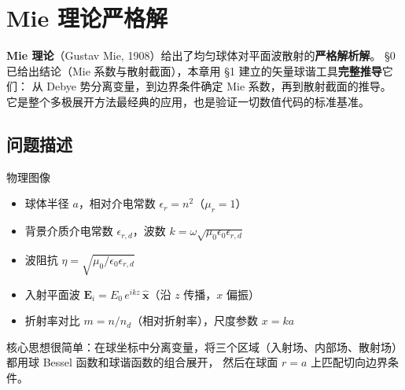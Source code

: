 \section{Mie 理论严格解}

\textbf{Mie 理论}（Gustav Mie, 1908）给出了均匀球体对平面波散射的\textbf{严格解析解}。
\S0 已给出结论（Mie 系数与散射截面），本章用 \S1 建立的矢量球谐工具\textbf{完整推导}它们：
从 Debye 势分离变量，到边界条件确定 Mie 系数，再到散射截面的推导。
它是整个多极展开方法最经典的应用，也是验证一切数值代码的标准基准。

\subsection{问题描述}

\begin{stepbox}{物理图像}
\begin{center}
\end{center}

\begin{itemize}
  \item 球体半径 $a$，相对介电常数 $\epsilon_r = n^2$（$\mu_r = 1$）
  \item 背景介质介电常数 $\epsilon_{r,d}$，波数 $k = \omega\sqrt{\mu_0\epsilon_0\epsilon_{r,d}}$
  \item 波阻抗 $\eta = \sqrt{\mu_0/\epsilon_0\epsilon_{r,d}}$
  \item 入射平面波 $\mathbf{E}_i = E_0\,e^{ikz}\,\hat{\mathbf{x}}$（沿 $z$ 传播，$x$ 偏振）
  \item 折射率对比 $m = n/n_d$（相对折射率），尺度参数 $x = ka$
\end{itemize}
\end{stepbox}

核心思想很简单：在球坐标中分离变量，将三个区域（入射场、内部场、散射场）都用球 Bessel 函数和球谐函数的组合展开，
然后在球面 $r=a$ 上匹配切向边界条件。

